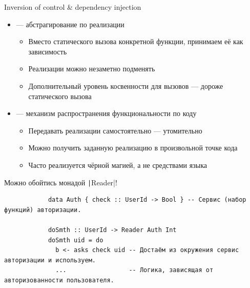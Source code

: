     \begin{frame}[fragile]{Inversion of control \& dependency injection \popslide}
        \vspace{-0.5em}
        \begin{itemize}
            \item[\defi]  --- абстрагирование по реализации
            \begin{itemize}
                \item Вместо статического вызова конкретной функции, принимаем её как зависимость
                \item[\positive] Реализации можно незаметно подменять
                \item[\negative] Дополнительный уровень косвенности для вызовов --- дороже статического вызова
            \end{itemize}
            \item[\defi]  --- механизм распространения функциональности по коду
            \begin{itemize}
                \item Передавать реализации самостоятельно --- утомительно
                \item[\positive] Можно получить заданную реализацию в произвольной точке кода
                \item[\negative] Часто реализуется чёрной магией, а не средствами языка
            \end{itemize}
        \end{itemize}
        \vspace{0.5em}
        Можно обойтись монадой \texttt|Reader|!
        \begin{verbatim}
            data Auth { check :: UserId -> Bool } -- Сервис (набор функций) авторизации.

            doSmth :: UserId -> Reader Auth Int
            doSmth uid = do
              b <- asks check uid -- Достаём из окружения сервис авторизации и используем.
              ...                 -- Логика, зависящая от авторизованности пользователя.
        \end{verbatim}
    \end{frame}

